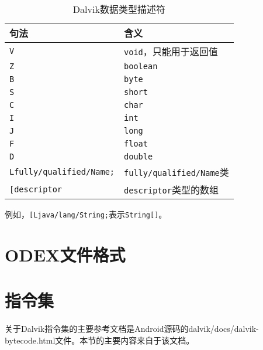 \begin{table}[htbp]
  \caption{Dalvik数据类型描述符}
  \label{Fig:dalvik_type}
  \centering
  \begin{tabular}{ll}
    \toprule
    \textbf{句法} & \textbf{含义} \\
    \midrule
    \lstinline!V! & \lstinline!void!，只能用于返回值 \\
    \lstinline!Z! & \lstinline!boolean! \\
    \lstinline!B! & \lstinline!byte! \\
    \lstinline!S! & \lstinline!short! \\
    \lstinline!C! & \lstinline!char! \\
    \lstinline!I! & \lstinline!int! \\
    \lstinline!J! & \lstinline!long! \\
    \lstinline!F! & \lstinline!float! \\
    \lstinline!D! & \lstinline!double! \\
    \lstinline!Lfully/qualified/Name;! & \lstinline!fully/qualified/Name!类 \\
    \lstinline![descriptor! & \lstinline!descriptor!类型的数组 \\
    \bottomrule
  \end{tabular}
\end{table}

例如，\lstinline![Ljava/lang/String;!表示\lstinline!String[]!。

\section{ODEX文件格式}
\label{Sec:odex}

\section{指令集}
关于Dalvik指令集的主要参考文档是Android源码的dalvik/docs/dalvik-bytecode.html文件。本节的主要内容来自于该文档。


